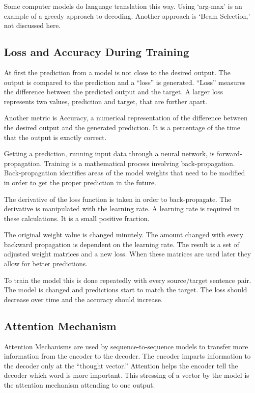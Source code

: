 Some computer models do language translation this way. Using `arg-max' is an example of a greedy approach to decoding. Another approach is `Beam Selection,' not discussed here. 



\subsection{Loss and Accuracy During Training}

At first the prediction from a model is not close to the desired output. The output is compared to the prediction and a ``loss'' is generated. ``Loss'' measures the difference between the predicted output and the target. A larger loss represents two values, prediction and target, that are further apart. 

Another metric is Accuracy, a numerical representation of the difference between the desired output and the generated prediction. It is a percentage of the time that the output is exactly correct.

Getting a prediction, running input data through a neural network, is forward-propagation. Training is a mathematical process involving back-propagation. Back-propagation identifies areas of the model weights that need to be modified in order to get the proper prediction in the future.

The derivative of the loss function is taken in order to back-propagate. The derivative is manipulated with the learning rate. A learning rate is required in these calculations. It is a small positive fraction. 

The original weight value is changed minutely. The amount changed with every backward propagation is dependent on the learning rate. The result is a set of adjusted weight matrices and a new loss. When these matrices are used later they allow for better predictions. 

To train the model this is done repeatedly with every source/target sentence pair. The model is changed and predictions start to match the target. The loss should decrease over time and the accuracy should increase.


\subsection{Attention Mechanism}

\label{section-gru-attention}

Attention Mechanisms are used by sequence-to-sequence models to transfer more information from the encoder to the decoder. The encoder imparts information to the decoder only at the ``thought vector.'' Attention helps the encoder tell the decoder which word is more important. This stressing of a vector by the model is the attention mechanism attending to one output.

